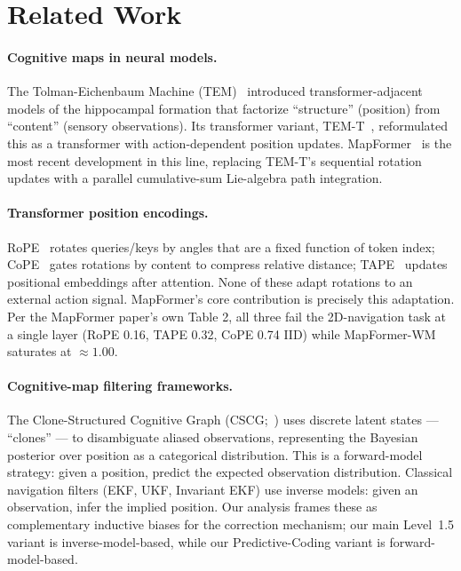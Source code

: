 \section{Related Work}
\label{sec:related}

\paragraph{Cognitive maps in neural models.} The Tolman-Eichenbaum Machine
(TEM)~\citep{whittington2020tem} introduced transformer-adjacent models of
the hippocampal formation that factorize ``structure'' (position) from
``content'' (sensory observations). Its transformer variant,
TEM-T~\citep{whittington2022tem-t}, reformulated this as a transformer with
action-dependent position updates. MapFormer~\citep{rambaud2025mapformer}
is the most recent development in this line, replacing TEM-T's sequential
rotation updates with a parallel cumulative-sum Lie-algebra path integration.

\paragraph{Transformer position encodings.} RoPE~\citep{su2021roformer}
rotates queries/keys by angles that are a fixed function of token index;
CoPE~\citep{golovneva2024cope} gates rotations by content to compress
relative distance; TAPE~\citep{zhu2025tape} updates positional embeddings
after attention. None of these adapt rotations to an external action
signal. MapFormer's core contribution is precisely this adaptation. Per
the MapFormer paper's own Table 2, all three fail the 2D-navigation task
at a single layer (RoPE 0.16, TAPE 0.32, CoPE 0.74 IID) while
MapFormer-WM saturates at $\approx 1.00$.

\paragraph{Cognitive-map filtering frameworks.} The Clone-Structured
Cognitive Graph (CSCG;~\citealp{george2021cscg}) uses discrete latent
states --- ``clones'' --- to disambiguate aliased observations,
representing the Bayesian posterior over position as a categorical
distribution. This is a forward-model strategy: given a position, predict
the expected observation distribution. Classical navigation filters
(EKF, UKF, Invariant EKF) use inverse models: given an observation,
infer the implied position. Our analysis frames these as complementary
inductive biases for the correction mechanism; our main Level~1.5
variant is inverse-model-based, while our Predictive-Coding variant is
forward-model-based.

